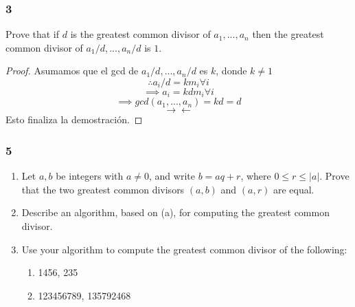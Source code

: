 \documentclass[11pt]{article}
\newcommand{\contr}{\rightarrow\leftarrow}
\theoremstyle{definition}
\begin{document}
        \subsubsection{3}
        Prove that if $d$ is the greatest common divisor of $a_1,...,a_n$ then the greatest common divisor of $a_1/d,...,a_n/d$ is $1$.
        \begin{proof}
            Asumamos que el gcd de $a_1/d,...,a_n/d$ es $k$, donde $k\neq 1$
            \[\therefore a_i/d=km_i\forall i\]
            \[\implies a_i=kdm_i\forall i\]
            \[\implies gcd(a_1,...,a_n)=kd=d\]
            \[\contr\]
            Esto finaliza la demostración.
        \end{proof}

        \subsubsection{5}
        \begin{enumerate}[label=\textbf{(\alph*)}]
            \item Let $a,b$ be integers with $a\neq 0$, and write $b=aq+r$, where $0\leq r\leq |a|$. Prove that the two greatest common divisors $(a,b)$ and $(a,r)$ are equal.

            \item Describe an algorithm, based on (a), for computing the greatest common divisor.

            \item Use your algorithm to compute the greatest common divisor of the following:
            \begin{enumerate}[label=(\alph*)]
                \item 1456, 235

                \item 123456789, 135792468
            \end{enumerate}
        \end{enumerate}
\end{document}
